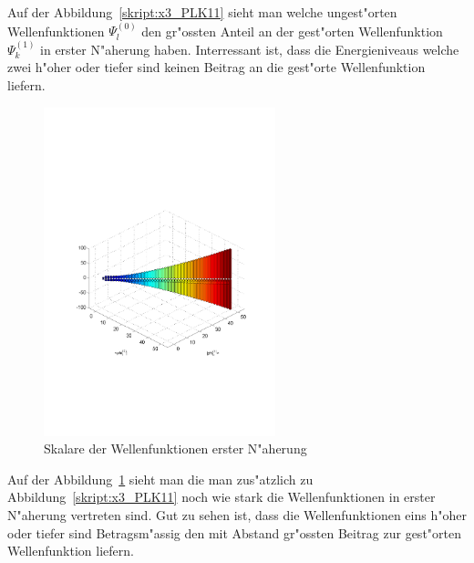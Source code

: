 \begin{refsection}
Auf der Abbildung~\ref{skript:x3_PLK11} sieht man welche ungest"orten Wellenfunktionen $\Psi_l^{(0)}$ den gr"ossten Anteil an der gest"orten Wellenfunktion $\Psi_k^{(1)}$ in erster N"aherung haben. Interressant ist, dass die Energieniveaus welche zwei h"oher oder tiefer sind keinen Beitrag an die gest"orte Wellenfunktion liefern.

\begin{figure}[h]	%
\centering
\includegraphics[width=0.6\textwidth]{anharmonisch/images/x3/PLK12.pdf}
\caption{Skalare der Wellenfunktionen erster N"aherung
\label{skript:x3_PLK12}}
\end{figure}

Auf der Abbildung~\ref{skript:x3_PLK12} sieht man die man zus"atzlich zu Abbildung~\ref{skript:x3_PLK11} noch wie stark die Wellenfunktionen in erster N"aherung vertreten sind. Gut zu sehen ist, dass die Wellenfunktionen eins h"oher oder tiefer sind Betragsm"assig den mit Abstand gr"ossten Beitrag zur gest"orten Wellenfunktion liefern.


\end{refsection}
